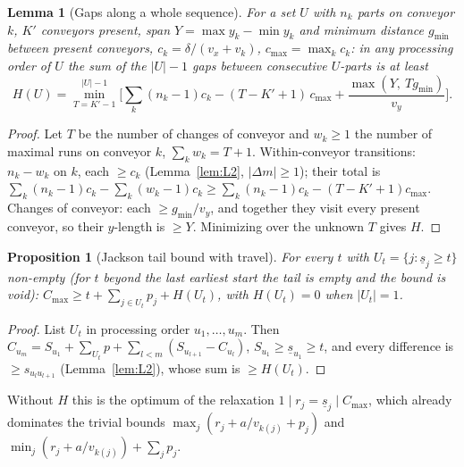 \documentclass[11pt,a4paper]{article}
\theoremstyle{plain}
\newtheorem{proposition}{Proposition}
\newtheorem{lemma}{Lemma}
\theoremstyle{definition}
\theoremstyle{remark}
\begin{document}
\begin{lemma}[Gaps along a whole sequence]\label{lem:H}
For a set $U$ with $n_k$ parts on conveyor $k$, $K'$ conveyors present, span
$Y=\max y_k-\min y_k$ and minimum distance $g_{\min}$ between present conveyors,
$c_k=\delta/(v_x+v_k)$, $c_{\max}=\max_kc_k$: in any processing order of $U$ the sum of
the $|U|-1$ gaps between consecutive $U$-parts is at least
\[
H(U)=\min_{T=K'-1}^{|U|-1}\Big[\sum_k(n_k-1)c_k-(T-K'+1)\,c_{\max}+\frac{\max(Y,\ Tg_{\min})}{v_y}\Big].
\]
\end{lemma}
\begin{proof}
Let $T$ be the number of changes of conveyor and $w_k\ge1$ the number of maximal runs on
conveyor $k$, $\sum_kw_k=T+1$. Within-conveyor transitions: $n_k-w_k$ on $k$, each
$\ge c_k$ (Lemma~\ref{lem:L2}, $|\Delta m|\ge1$); their total is
$\sum_k(n_k-1)c_k-\sum_k(w_k-1)c_k\ge\sum_k(n_k-1)c_k-(T-K'+1)c_{\max}$. Changes of
conveyor: each $\ge g_{\min}/v_y$, and together they visit every present conveyor, so their
$y$-length is $\ge Y$. Minimizing over the unknown $T$ gives $H$.
\end{proof}

\begin{proposition}[Jackson tail bound with travel]\label{prop:L3}
For every $t$ with $U_t=\{j:\underline s_j\ge t\}$ non-empty (for $t$ beyond the last
earliest start the tail is empty and the bound is void):
$C_{\max}\ge t+\sum_{j\in U_t}p_j+H(U_t)$, with $H(U_t)=0$ when $|U_t|=1$.
\end{proposition}
\begin{proof}
List $U_t$ in processing order $u_1,\dots,u_m$. Then
$C_{u_m}=S_{u_1}+\sum_{U_t}p+\sum_{l<m}(S_{u_{l+1}}-C_{u_l})$, $S_{u_1}\ge\underline s_{u_1}\ge t$,
and every difference is $\ge s_{u_lu_{l+1}}$ (Lemma~\ref{lem:L2}), whose sum is $\ge H(U_t)$.
\end{proof}
Without $H$ this is the optimum of the relaxation $1\mid r_j{=}\underline s_j\mid C_{\max}$,
which already dominates the trivial bounds $\max_j(r_j+a/v_{k(j)}+p_j)$ and
$\min_j(r_j+a/v_{k(j)})+\sum_jp_j$.
\end{document}
